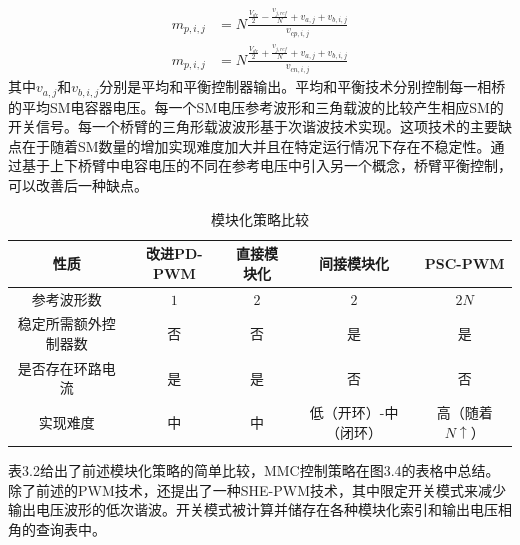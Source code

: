 \begin{enumerate}[1)]
\begin{align*}
m_{p,i,j} &= N\frac{\frac{V_{dc}}{2}-\frac{v_{j,ref}}{N}+v_{a,j}+v_{b,i,j}}{v_{cp,i,j}}\tag{3a}\\
m_{p,i,j} &= N\frac{\frac{V_{dc}}{2}+\frac{v_{j,ref}}{N}+v_{a,j}+v_{b,i,j}}{v_{cn,i,j}}\tag{3b}
\end{align*}
  其中$v_{a,j}$和$v_{b,i,j}$分别是平均和平衡控制器输出。平均和平衡技术分别控制每一相桥的平均SM电容器电压。每一个SM电压参考波形和三角载波的比较产生相应SM的开关信号。每一个桥臂的三角形载波波形基于次谐波技术实现。这项技术的主要缺点在于随着SM数量的增加实现难度加大并且在特定运行情况下存在不稳定性。通过基于上下桥臂中电容电压的不同在参考电压中引入另一个概念，桥臂平衡控制，可以改善后一种缺点。
  \end{enumerate}
\begin{table}[h]
\begin{center}
\small
\begin{tabular}[c]{ccccc}
\toprule
性质 & 改进PD-PWM & 直接模块化 & 间接模块化 & PSC-PWM\\
\midrule
参考波形数 & $1$ & $2$ & $2$ & $2N$\\ 
稳定所需额外控制器数 & 否 & 否 & 是 & 是\\ 
是否存在环路电流 & 是 & 是 & 否 & 否 \\ 
实现难度 & 中 & 中 & 低（开环）-中（闭环） & 高（随着$N\uparrow$） \\ 
\bottomrule
\end{tabular}
\caption{模块化策略比较}
\end{center}
\end{table}
  
  表3.2给出了前述模块化策略的简单比较，MMC控制策略在图3.4的表格中总结。除了前述的PWM技术，还提出了一种SHE-PWM技术，其中限定开关模式来减少输出电压波形的低次谐波。开关模式被计算并储存在各种模块化索引和输出电压相角的查询表中。
  
